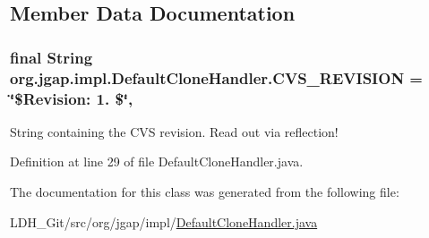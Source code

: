 \subsection{Member Data Documentation}
\hypertarget{classorg_1_1jgap_1_1impl_1_1_default_clone_handler_ad2c84d3ba1cdd65ab5f18391a676745f}{
\subsubsection[{C\-V\-S\-\_\-\-R\-E\-V\-I\-S\-I\-O\-N}]{\setlength{\rightskip}{0pt plus 5cm}final String org.\-jgap.\-impl.\-Default\-Clone\-Handler.\-C\-V\-S\-\_\-\-R\-E\-V\-I\-S\-I\-O\-N = \char`\"{}\$Revision\-: 1. \$\char`\"{}\hspace{0.3cm}{\ttfamily [static]}, {\ttfamily [private]}}}\label{classorg_1_1jgap_1_1impl_1_1_default_clone_handler_ad2c84d3ba1cdd65ab5f18391a676745f}
String containing the C\-V\-S revision. Read out via reflection! 

Definition at line 29 of file Default\-Clone\-Handler.\-java.



The documentation for this class was generated from the following file\-:\begin{DoxyCompactItemize}
\item 
L\-D\-H\-\_\-\-Git/src/org/jgap/impl/\hyperlink{_default_clone_handler_8java}{Default\-Clone\-Handler.\-java}\end{DoxyCompactItemize}

